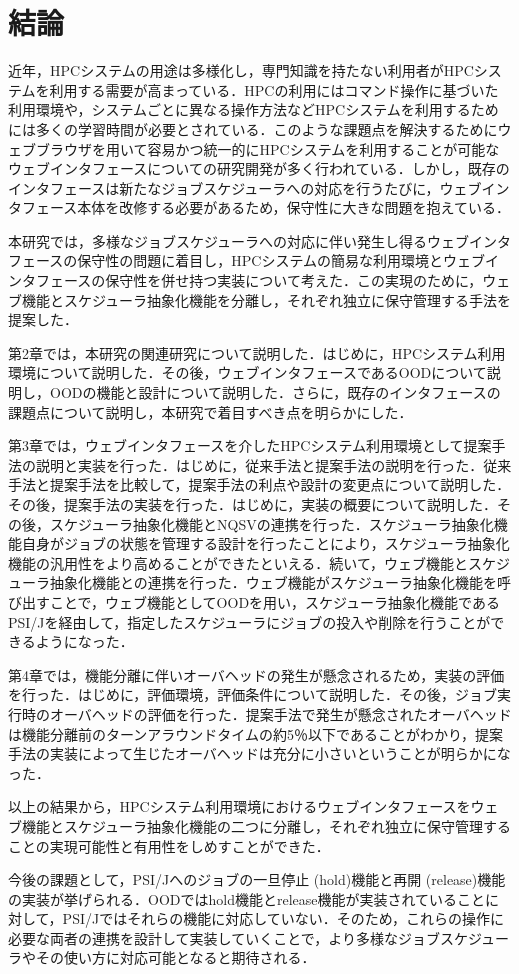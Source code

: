 \section{結論}
近年，HPCシステムの用途は多様化し，専門知識を持たない利用者がHPCシステムを利用する需要が高まっている．HPCの利用にはコマンド操作に基づいた利用環境や，システムごとに異なる操作方法などHPCシステムを利用するためには多くの学習時間が必要とされている．このような課題点を解決するためにウェブブラウザを用いて容易かつ統一的にHPCシステムを利用することが可能なウェブインタフェースについての研究開発が多く行われている．しかし，既存のインタフェースは新たなジョブスケジューラへの対応を行うたびに，ウェブインタフェース本体を改修する必要があるため，保守性に大きな問題を抱えている．\par
本研究では，多様なジョブスケジューラへの対応に伴い発生し得るウェブインタフェースの保守性の問題に着目し，HPCシステムの簡易な利用環境とウェブインタフェースの保守性を併せ持つ実装について考えた．この実現のために，ウェブ機能とスケジューラ抽象化機能を分離し，それぞれ独立に保守管理する手法を提案した．\par
第2章では，本研究の関連研究について説明した．はじめに，HPCシステム利用環境について説明した．その後，ウェブインタフェースであるOODについて説明し，OODの機能と設計について説明した．さらに，既存のインタフェースの課題点について説明し，本研究で着目すべき点を明らかにした．\par
第3章では，ウェブインタフェースを介したHPCシステム利用環境として提案手法の説明と実装を行った．はじめに，従来手法と提案手法の説明を行った．従来手法と提案手法を比較して，提案手法の利点や設計の変更点について説明した．その後，提案手法の実装を行った．はじめに，実装の概要について説明した．その後，スケジューラ抽象化機能とNQSVの連携を行った．スケジューラ抽象化機能自身がジョブの状態を管理する設計を行ったことにより，スケジューラ抽象化機能の汎用性をより高めることができたといえる．続いて，ウェブ機能とスケジューラ抽象化機能との連携を行った．ウェブ機能がスケジューラ抽象化機能を呼び出すことで，ウェブ機能としてOODを用い，スケジューラ抽象化機能であるPSI/Jを経由して，指定したスケジューラにジョブの投入や削除を行うことができるようになった．\par
第4章では，機能分離に伴いオーバヘッドの発生が懸念されるため，実装の評価を行った．はじめに，評価環境，評価条件について説明した．その後，ジョブ実行時のオーバヘッドの評価を行った．提案手法で発生が懸念されたオーバヘッドは機能分離前のターンアラウンドタイムの約5％以下であることがわかり，提案手法の実装によって生じたオーバヘッドは充分に小さいということが明らかになった．\par
以上の結果から，HPCシステム利用環境におけるウェブインタフェースをウェブ機能とスケジューラ抽象化機能の二つに分離し，それぞれ独立に保守管理することの実現可能性と有用性をしめすことができた．\par
今後の課題として，PSI/Jへのジョブの一旦停止 (hold)機能と再開 (release)機能の実装が挙げられる．OODではhold機能とrelease機能が実装されていることに対して，PSI/Jではそれらの機能に対応していない．そのため，これらの操作に必要な両者の連携を設計して実装していくことで，より多様なジョブスケジューラやその使い方に対応可能となると期待される．

